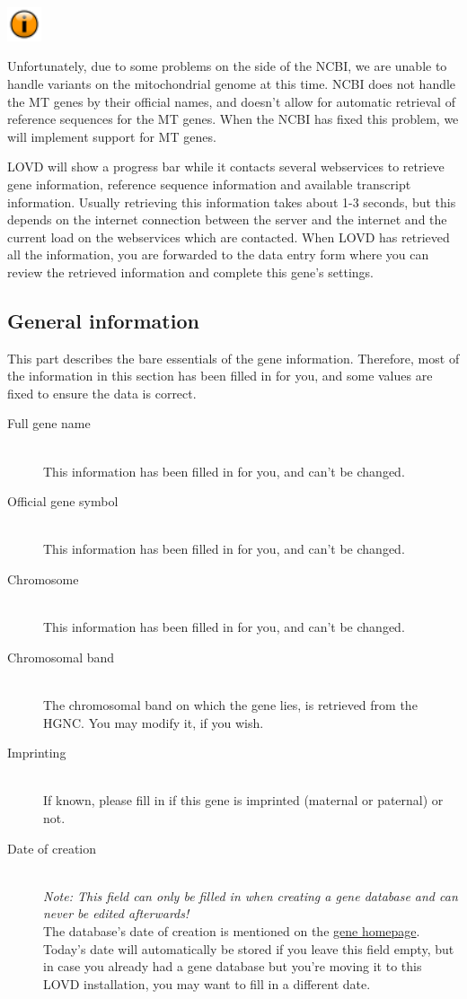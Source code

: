 \documentclass[a4paper,oneside,openany,12pt]{memoir}
\newlength{\infoboxlength}
\newlength{\infoboxinnerlength}
\newenvironment{infotable}
  {\begin{lrbox}{\infobox}%
    \begin{minipage}[t]{1.5cm}
      \centering
      \vspace{0pt}
      \includegraphics[width=1cm,height=1cm]{lovd_information.png}
    \end{minipage}
   \begin{minipage}[t]{\infoboxlength}\vspace{5pt}\begin{minipage}{\infoboxinnerlength}}
  {\vspace{6pt}\end{minipage}\end{minipage}\end{lrbox}%
   \begin{center}
   \fcolorbox{black}{LOVDlight}{\usebox{\infobox}}
   \end{center}}
\begin{document}
\begin{infotable}
Unfortunately, due to some problems on the side of the NCBI, we are unable to handle variants on the mitochondrial genome at this time.
NCBI does not handle the MT genes by their official names, and doesn't allow for automatic retrieval of reference sequences for the MT genes.
When the NCBI has fixed this problem, we will implement support for MT genes.
\end{infotable}

LOVD will show a progress bar while it contacts several webservices to retrieve gene information,
 reference sequence information and available transcript information.
Usually retrieving this information takes about 1-3 seconds, but this depends on the internet connection between
the server and the internet and the current load on the webservices which are contacted.
When LOVD has retrieved all the information, you are forwarded to the data entry form where
 you can review the retrieved information and complete this gene's settings.



\pagebreak[4] %
\subsection{General information}
This part describes the bare essentials of the gene information.
Therefore, most of the information in this section has been filled in for you, and some values are fixed to ensure the data is correct.
\begin{description}
  \item[Full gene name] \hfill \\
  This information has been filled in for you, and can't be changed.
  \item[Official gene symbol] \hfill \\
  This information has been filled in for you, and can't be changed.
  \item[Chromosome] \hfill \\
  This information has been filled in for you, and can't be changed.
  \item[Chromosomal band] \hfill \\
  The chromosomal band on which the gene lies, is retrieved from the HGNC.
  You may modify it, if you wish.
  \item[Imprinting] \hfill \\
  If known, please fill in if this gene is imprinted (maternal or paternal) or not.
  \item[Date of creation] \hfill \\
  \emph{Note: This field can only be filled in when creating a gene database and can never be edited afterwards!}
  \\
  The database's date of creation is mentioned on the \hyperlink{s_gene_homepage}{gene homepage}.
  Today's date will automatically be stored if you leave this field empty, but in case you already
   had a gene database but you're moving it to this LOVD installation, you may want to fill in a different date.
\end{description}
\end{document}
